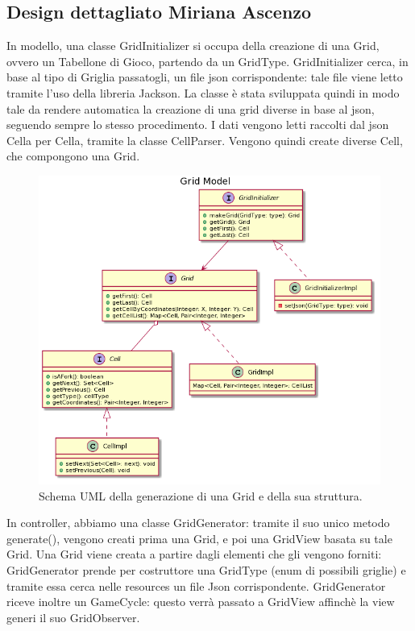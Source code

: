 \documentclass[a4paper,12pt]{report}
\begin{document}
	\subsection{Design dettagliato Miriana Ascenzo}

In modello, una classe GridInitializer si occupa della creazione di una Grid, ovvero un Tabellone di Gioco, partendo da un GridType.
%
GridInitializer cerca, in base al tipo di Griglia passatogli, un file json corrispondente: tale file viene letto tramite l'uso della libreria Jackson.
%
La classe è stata sviluppata quindi in modo tale da rendere automatica la creazione di una grid diverse in base al json, seguendo sempre lo stesso procedimento.
%
I dati vengono letti raccolti dal json Cella per Cella, tramite la classe CellParser.
%
Vengono quindi create diverse Cell, che compongono una Grid.

\begin{figure}[h]
	\centering{}
	\includegraphics[width=\textwidth]{images/miriana/grid_model.png}
	\caption{Schema UML della generazione di una Grid e della sua struttura.}
	\label{img:gridmodel}
\end{figure}

In controller, abbiamo una classe GridGenerator: tramite il suo unico metodo generate(), vengono creati prima una Grid, e poi una GridView basata su tale Grid.
%
Una Grid viene creata a partire dagli elementi che gli vengono forniti: GridGenerator prende per costruttore una GridType (enum di possibili griglie) e tramite essa cerca nelle resources un file Json corrispondente.
%
GridGenerator riceve inoltre un GameCycle: questo verrà passato a GridView affinchè la view generi il suo GridObserver.
\end{document}
